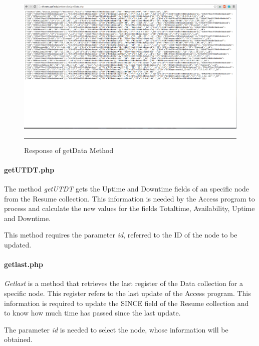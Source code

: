 \documentclass[12pt, a4paper,twoside]{tesi_upf}
\begin{document}
        \begin{figure}[H]
          \centering
              \includegraphics[scale=0.3,angle=0]{./figures/phpresponse.png}
              \rule{32em}{0.5pt}
            \caption[Response of getData Method]{Response of getData Method}
            \label{fig:phpre}
        \end{figure}
                
                \paragraph{getUTDT.php}
                The method \textit{getUTDT} gets the Uptime and Downtime fields of an specific node from the Resume collection. This information is needed by the Access program to process and calculate the new values for the fields Totaltime, Availability, Uptime and Downtime.
                
                This method requires the parameter \textit{id}, referred to the ID of the node to be updated.
                
                \paragraph{getlast.php}
                \textit{Getlast} is a method that retrieves the last register of the Data collection for a specific node. This register refers to the last update of the Access program. This information is required to update the SINCE field of the Resume collection and to know how much time has passed since the last update.
                
                The parameter \textit{id} is needed to select the node, whose information will be obtained.
            
\end{document}
